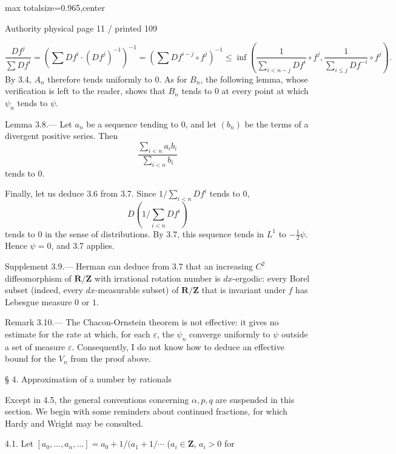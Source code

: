 \documentclass{article}
\begin{document}
\newpage
\noindent\begin{adjustbox}{max totalsize={\textwidth}{0.965\textheight},center}\begin{minipage}{\textwidth}
\noindent\hfill\scriptsize Authority physical page 11 / printed 109\par\normalsize
\[
\frac{Df^j}{\sum Df^i}
=\left(\sum Df^i\cdot(Df^j)^{-1}\right)^{-1}
=\left(\sum Df^{i-j}\circ f^j\right)^{-1}
\leq\inf\left(
\frac1{\sum_{i<n-j}Df^i}\circ f^j,
\frac1{\sum_{i\leq j}Df^{-i}}\circ f^j
\right).
\]
By 3.4, \(A_n\) therefore tends uniformly to \(0\). As for \(B_n\), the following lemma, whose verification is left to the reader, shows that \(B_n\) tends to \(0\) at every point at which \(\psi_n\) tends to \(\psi\).

Lemma 3.8.— Let \(a_n\) be a sequence tending to \(0\), and let \((b_n)\) be the terms of a divergent positive series. Then
\[
\frac{\sum_{i<n}a_ib_i}{\sum_{i<n}b_i}
\]
tends to \(0\).

Finally, let us deduce 3.6 from 3.7. Since \(1/\sum_{i<n}Df^i\) tends to \(0\),
\[
D\left(1/\sum_{i<n}Df^i\right)
\]
tends to \(0\) in the sense of distributions. By 3.7, this sequence tends in \(L^1\) to \(-\frac12\psi\). Hence \(\psi=0\), and 3.7 applies.

Supplement 3.9.— Herman can deduce from 3.7 that an increasing \(C^2\) diffeomorphism of \(\mathbf R/\mathbf Z\) with irrational rotation number is \(dx\)-ergodic: every Borel subset (indeed, every \(dx\)-measurable subset) of \(\mathbf R/\mathbf Z\) that is invariant under \(f\) has Lebesgue measure \(0\) or \(1\).

Remark 3.10.— The Chacon-Ornstein theorem is not effective: it gives no estimate for the rate at which, for each \(\varepsilon\), the \(\psi_n\) converge uniformly to \(\psi\) outside a set of measure \(\varepsilon\). Consequently, I do not know how to deduce an effective bound for the \(V_n\) from the proof above.

§ 4. Approximation of a number by rationals

Except in 4.5, the general conventions concerning \(\alpha,p,q\) are suspended in this section. We begin with some reminders about continued fractions, for which Hardy and Wright may be consulted.

4.1. Let \([a_0,\ldots,a_n,\ldots]=a_0+1/(a_1+1/\cdots\) (\(a_i\in\mathbf Z\), \(a_i>0\) for
\end{minipage}\end{adjustbox}
\end{document}
